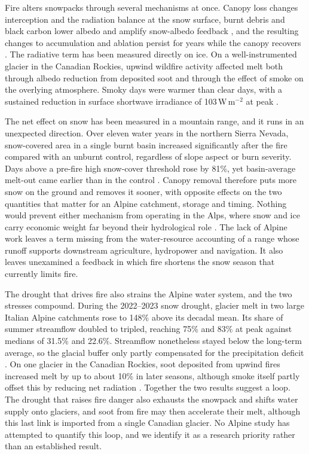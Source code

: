 \documentclass[11pt,a4paper]{article}
\begin{document}
Fire alters snowpacks through several mechanisms at once. Canopy loss changes interception and the radiation balance at the snow surface, burnt debris and black carbon lower albedo and amplify snow-albedo feedback \citep{koshkin_wildfire_2022, pepin_climate_2022}, and the resulting changes to accumulation and ablation persist for years while the canopy recovers \citep{koshkin_wildfire_2022}. The radiative term has been measured directly on ice. On a well-instrumented glacier in the Canadian Rockies, upwind wildfire activity affected melt both through albedo reduction from deposited soot and through the effect of smoke on the overlying atmosphere. Smoky days were warmer than clear days, with a sustained reduction in surface shortwave irradiance of 103\,W\,m$^{-2}$ at peak \citep{aubrywake_fire_2022}.

The net effect on snow has been measured in a mountain range, and it runs in an unexpected direction. Over eleven water years in the northern Sierra Nevada, snow-covered area in a single burnt basin increased significantly after the fire compared with an unburnt control, regardless of slope aspect or burn severity. Days above a pre-fire high snow-cover threshold rose by 81\%, yet basin-average melt-out came earlier than in the control \citep{micheletty_application_2014}. Canopy removal therefore puts more snow on the ground and removes it sooner, with opposite effects on the two quantities that matter for an Alpine catchment, storage and timing. Nothing would prevent either mechanism from operating in the Alps, where snow and ice carry economic weight far beyond their hydrological role \citep{pede_mountain_2022}. The lack of Alpine work leaves a term missing from the water-resource accounting of a range whose runoff supports downstream agriculture, hydropower and navigation. It also leaves unexamined a feedback in which fire shortens the snow season that currently limits fire.

The drought that drives fire also strains the Alpine water system, and the two stresses compound. During the 2022--2023 snow drought, glacier melt in two large Italian Alpine catchments rose to 148\% above its decadal mean. Its share of summer streamflow doubled to tripled, reaching 75\% and 83\% at peak against medians of 31.5\% and 22.6\%. Streamflow nonetheless stayed below the long-term average, so the glacial buffer only partly compensated for the precipitation deficit \citep{leone_20222023_2026}. On one glacier in the Canadian Rockies, soot deposited from upwind fires increased melt by up to about 10\% in later seasons, although smoke itself partly offset this by reducing net radiation \citep{aubrywake_fire_2022}. Together the two results suggest a loop. The drought that raises fire danger also exhausts the snowpack and shifts water supply onto glaciers, and soot from fire may then accelerate their melt, although this last link is imported from a single Canadian glacier. No Alpine study has attempted to quantify this loop, and we identify it as a research priority rather than an established result.
\end{document}
